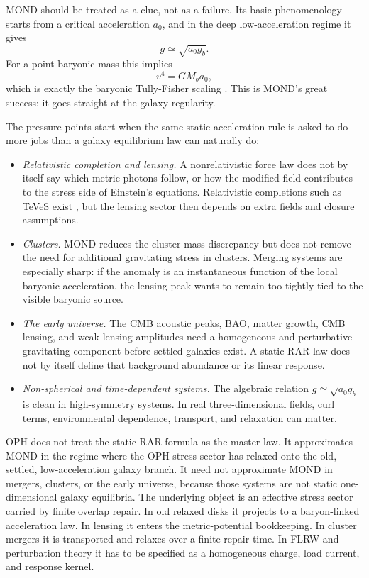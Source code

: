 \documentclass[11pt]{article}
\begin{document}
MOND should be treated as a clue, not as a failure.  Its basic phenomenology
starts from a critical acceleration \(a_0\), and in the deep low-acceleration
regime it gives
\begin{equation}
  g \simeq \sqrt{a_0 g_b}.
\end{equation}
For a point baryonic mass this implies
\begin{equation}
  v^4 = G M_b a_0,
\end{equation}
which is exactly the baryonic Tully-Fisher scaling \cite{milgrom1983}.  This
is MOND's great success: it goes straight at the galaxy regularity.

The pressure points start when the same static acceleration rule is asked to
do more jobs than a galaxy equilibrium law can naturally do:
\begin{itemize}
\item \emph{Relativistic completion and lensing.}  A nonrelativistic force law
does not by itself say which metric photons follow, or how the modified field
contributes to the stress side of Einstein's equations.  Relativistic
completions such as TeVeS exist \cite{bekenstein2004}, but the lensing sector
then depends on extra fields and closure assumptions.
\item \emph{Clusters.}  MOND reduces the cluster mass discrepancy but does not
remove the need for additional gravitating stress in clusters.  Merging systems
are especially sharp: if the anomaly is an instantaneous function of the local
baryonic acceleration, the lensing peak wants to remain too tightly tied to the
visible baryonic source.
\item \emph{The early universe.}  The CMB acoustic peaks, BAO, matter growth,
CMB lensing, and weak-lensing amplitudes need a homogeneous and perturbative
gravitating component before settled galaxies exist.  A static RAR law does
not by itself define that background abundance or its linear response.
\item \emph{Non-spherical and time-dependent systems.}  The algebraic
relation \(g\simeq\sqrt{a_0g_b}\) is clean in high-symmetry systems.  In real
three-dimensional fields, curl terms, environmental dependence, transport, and
relaxation can matter.
\end{itemize}

OPH does not treat the static RAR formula as the master law.  It approximates
MOND in the regime where the OPH stress sector has relaxed onto the old,
settled, low-acceleration galaxy branch.  It need not approximate MOND in
mergers, clusters, or the early universe, because those systems are not static
one-dimensional galaxy equilibria.  The underlying object is an effective
stress sector carried by finite overlap repair.  In old relaxed disks it
projects to a baryon-linked acceleration law.  In lensing it enters the
metric-potential bookkeeping.  In cluster mergers it is transported and
relaxes over a finite repair time.  In FLRW and perturbation theory it has to
be specified as a homogeneous charge, load current, and response kernel.
\end{document}

